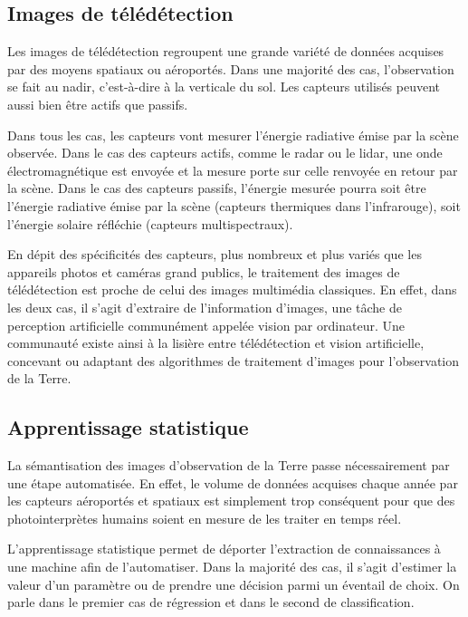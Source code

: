 \subsection{Images de télédétection}

Les images de télédétection regroupent une grande variété de données acquises par des moyens spatiaux ou aéroportés. Dans une majorité des cas, l'observation se fait au nadir, c'est-à-dire à la verticale du sol. Les capteurs utilisés peuvent aussi bien être actifs que passifs.

Dans tous les cas, les capteurs vont mesurer l'énergie radiative émise par la scène observée. Dans le cas des capteurs actifs, comme le radar ou le lidar, une onde électromagnétique est envoyée et la mesure porte sur celle renvoyée en retour par la scène. Dans le cas des capteurs passifs, l'énergie mesurée pourra soit être l'énergie radiative émise par la scène (capteurs thermiques dans l'infrarouge), soit l'énergie solaire réfléchie (capteurs multispectraux).

En dépit des spécificités des capteurs, plus nombreux et plus variés que les appareils photos et caméras grand publics, le traitement des images de télédétection est proche de celui des images multimédia classiques. En effet, dans les deux cas, il s'agit d'extraire de l'information d'images, une tâche de perception artificielle communément appelée vision par ordinateur. Une communauté existe ainsi à la lisière entre télédétection et vision artificielle, concevant ou adaptant des algorithmes de traitement d'images pour l'observation de la Terre.

\subsection{Apprentissage statistique}

La sémantisation des images d'observation de la Terre passe nécessairement par une étape automatisée. En effet, le volume de données acquises chaque année par les capteurs aéroportés et spatiaux est simplement trop conséquent pour que des photointerprètes humains soient en mesure de les traiter en temps réel.

L'apprentissage statistique permet de déporter l'extraction de connaissances à une machine afin de l'automatiser. Dans la majorité des cas, il s'agit d'estimer la valeur d'un paramètre ou de prendre une décision parmi un éventail de choix. On parle dans le premier cas de régression et dans le second de classification.

